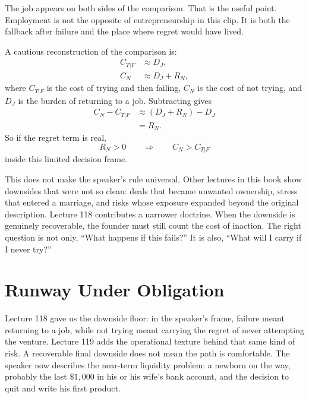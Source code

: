 \documentclass[11pt,oneside]{book}
\begin{document}
The job appears on both sides of the comparison. That is the useful point. Employment is not the opposite of entrepreneurship in this clip. It is both the fallback after failure and the place where regret would have lived.

A cautious reconstruction of the comparison is:
\begin{align}
C_{T|F} &\approx D_J,\\
C_N &\approx D_J + R_N,
\end{align}
where \(C_{T|F}\) is the cost of trying and then failing, \(C_N\) is the cost of not trying, and \(D_J\) is the burden of returning to a job. Subtracting gives
\begin{align}
C_N-C_{T|F}
&\approx (D_J+R_N)-D_J\\
&=R_N.
\end{align}
So if the regret term is real,
\[
R_N>0
\qquad\Longrightarrow\qquad
C_N>C_{T|F}
\]
inside this limited decision frame.

This does not make the speaker's rule universal. Other lectures in this book show downsides that were not so clean: deals that became unwanted ownership, stress that entered a marriage, and risks whose exposure expanded beyond the original description. Lecture 118 contributes a narrower doctrine. When the downside is genuinely recoverable, the founder must still count the cost of inaction. The right question is not only, ``What happens if this fails?'' It is also, ``What will I carry if I never try?''


\section{Runway Under Obligation}

Lecture 118 gave us the downside floor: in the speaker's frame, failure meant returning to a job, while not trying meant carrying the regret of never attempting the venture. Lecture 119 adds the operational texture behind that same kind of risk. A recoverable final downside does not mean the path is comfortable. The speaker now describes the near-term liquidity problem: a newborn on the way, probably the last \(\$1{,}000\) in his or his wife's bank account, and the decision to quit and write his first product.
\end{document}
